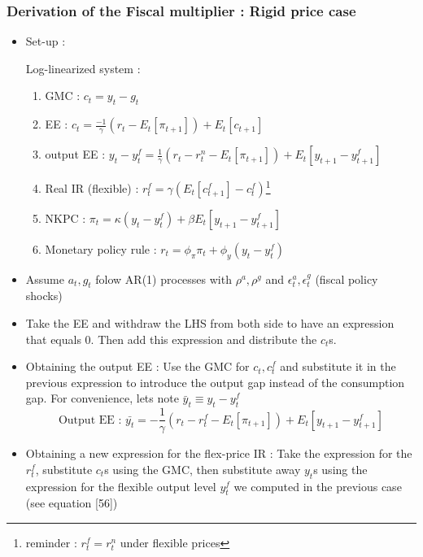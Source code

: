 \documentclass{article}
\begin{document}
\subsubsection{Derivation of the Fiscal multiplier : Rigid price case}
\begin{itemize}
    \item Set-up : 
    \begin{RecapBox}
        Log-linearized system : 
        \begin{enumerate}
            \item GMC : $c_t = y_t -g_t$
            \item EE : $c_t = \frac{-1}{\gamma}(r_t-E_t[\pi_{t+1}]) + E_t[c_{t+1}]$
            \item output EE : $y_t-y_t^f = \frac{1}{\gamma}(r_t-r_t^n-E_t[\pi_{t+1}]) + E_t[y_{t+1}-y_{t+1}^f]$
            \item Real IR (flexible) : $r_t^f = \gamma(E_t[c_{t+1}^f]-c_t^f)$\footnote{reminder : $r_t^f = r_t^n$ under flexible prices} 
            \item NKPC : $\pi_t = \kappa(y_t-y_t^f) + \beta E_t[y_{t+1}-y_{t+1}^f]$
            \item Monetary policy rule : $r_t = \phi_\pi\pi_t + \phi_y(y_t-y_t^f)$
        \end{enumerate}
    \end{RecapBox}
    \item Assume $a_t,g_t$ folow AR(1) processes with $\rho^a,\rho^g$ and $\epsilon_t^a, \epsilon_t^g$ (fiscal policy shocks)
    \item Take the EE and withdraw the LHS from both side to have an expression that equals 0. Then add this expression and distribute the $c_t$s.
    \item Obtaining the output EE : Use the GMC for $c_t,c_t^f$ and substitute it in the previous expression to introduce the output gap instead of the consumption gap. For convenience, lets note $\bar{y}_t \equiv y_t-y_t^f$
    \begin{equation}
        \text{Output EE : }\bar{y_t} = -\frac{1}{\gamma} (r_t-r_t^f - E_t[\pi_{t+1}]) + E_t[y_{t+1}-y_{t+1}^f]
    \end{equation}
    \item Obtaining a new expression for the flex-price IR : Take the expression for the $r_t^f$, substitute $c_t$s using the GMC, then substitute away $y_t$s using the expression for the flexible output level $y_t^f$ we computed in the previous case (see equation [56])
    \begin{equation}

\end{equation}
\end{itemize}
\end{document}
